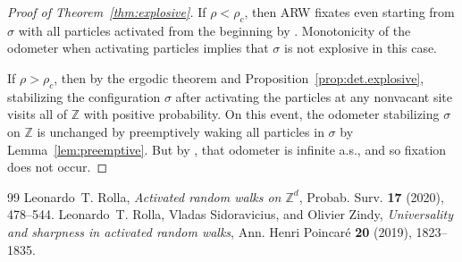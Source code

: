 \documentclass[10pt,a4paper]{amsart}
\begin{document}
\setcounter{section}{2}
\setcounter{equation}{5}
\setcounter{theorem}{5}
\begin{proof}[Proof of Theorem~\ref{thm:explosive}]
If $\rho <\rho _{c}$, then ARW fixates even starting from $\sigma $ with
all particles activated from the beginning by
\cite[Theorem~1]{RollaSidoraviciusZindy19}. Monotonicity of the odometer
when activating particles \cite[Lemma~2.5]{rolla2020activated} implies
that $\sigma $ is not explosive in this case.

If $\rho >\rho _{c}$, then by the ergodic theorem and Proposition~\ref{prop:det.explosive},
stabilizing the configuration $\sigma $ after activating the particles
at any nonvacant site visits all of $\mathbb{Z}$ with positive probability.
On this event, the odometer stabilizing $\sigma$ on $\mathbb{Z}$ is unchanged
by preemptively waking all particles in $\sigma$ by Lemma~\ref{lem:preemptive}.
But by \cite[Theorem~1]{RollaSidoraviciusZindy19}, that odometer is infinite
a.s., and so fixation does not occur.
\end{proof}

\begin{thebibliography}{99}
 Leonardo~T. Rolla, \emph{Activated random walks on {$\mathbb{Z}^{d}$}}, Probab. Surv. \textbf{17} (2020), 478--544.  %
 Leonardo~T. Rolla, Vladas Sidoravicius, and Olivier Zindy, \emph{Universality and sharpness in activated random walks}, Ann. Henri Poincar{\'e} \textbf{20} (2019), 1823--1835. %
\end{thebibliography}
\end{document}

